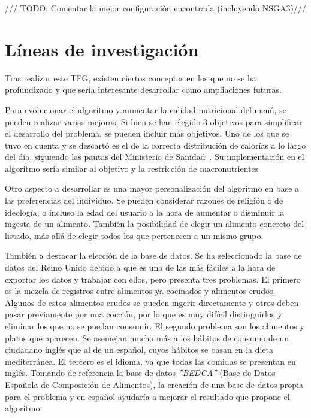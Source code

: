 \begin{center}
    {\color{red} \Large /// TODO: Comentar la mejor configuración encontrada (incluyendo NSGA3)///}
\end{center}


\section{Líneas de investigación}
\label{ch:investigacion}

Tras realizar este TFG, existen ciertos conceptos en los que no se ha profundizado y que sería interesante desarrollar como ampliaciones futuras.

Para evolucionar el algoritmo y aumentar la calidad nutricional del menú, se pueden realizar varias mejoras. Si bien se han elegido 3 objetivos para simplificar el desarrollo del problema, se pueden incluir más objetivos. Uno de los que se tuvo en cuenta y se descartó es el de la correcta distribución de calorías a lo largo del día, siguiendo las pautas del Ministerio de Sanidad~\cite{alimentacion_saludable}. Su implementación en el algoritmo sería similar al objetivo y la restricción de macronutrientes

Otro aspecto a desarrollar es una mayor personalización del algoritmo en base a las preferencias del individuo. Se pueden considerar razones de religión o de ideología, o incluso la edad del usuario a la hora de aumentar o disminuir la ingesta de un alimento. También la posibilidad de elegir un alimento concreto del listado, más allá de elegir todos los que pertenecen a un mismo grupo.

También a destacar la elección de la base de datos. Se ha seleccionado la base de datos del Reino Unido debido a que es una de las más fáciles a la hora de exportar los datos y trabajar con ellos, pero presenta tres problemas. El primero es la mezcla de registros entre alimentos ya cocinados y alimentos crudos. Algunos de estos alimentos crudos se pueden ingerir directamente y otros deben pasar previamente por una cocción, por lo que es muy difícil distinguirlos y eliminar los que no se puedan consumir. El segundo problema son los alimentos y platos que aparecen. Se asemejan mucho más a los hábitos de consumo de un ciudadano inglés que al de un español, cuyos hábitos se basan en la dieta mediterránea. El tercero es el idioma, ya que todas las comidas se presentan en inglés. Tomando de referencia la base de datos \textit{''BEDCA''} (Base de Datos Española de Composición de Alimentos), la creación de una base de datos propia para el problema y en español ayudaría a mejorar el resultado que propone el algoritmo.

